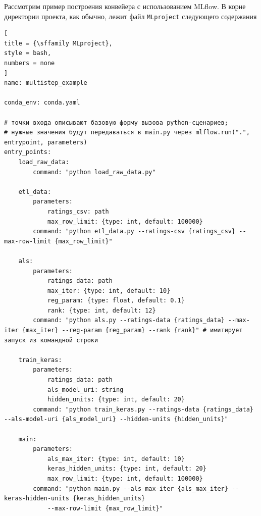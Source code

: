 \documentclass[%
	11pt,
	a4paper,
	utf8,
		]{article}
\begin{document}
Рассмотрим пример построения конвейера с использованием MLflow. В корне директории проекта, как обычно, лежит файл \texttt{MLproject} следующего содержания
\begin{lstlisting}[
title = {\sffamily MLproject},
style = bash,
numbers = none	
]
name: multistep_example

conda_env: conda.yaml

# точки входа описывают базовую форму вызова python-сценариев;
# нужные значения будут передаваться в main.py через mlflow.run(".", entrypoint, parameters)
entry_points:
	load_raw_data:
		command: "python load_raw_data.py"

	etl_data:
		parameters:
			ratings_csv: path
			max_row_limit: {type: int, default: 100000}
		command: "python etl_data.py --ratings-csv {ratings_csv} --max-row-limit {max_row_limit}"

	als:
		parameters:
			ratings_data: path
			max_iter: {type: int, default: 10}
			reg_param: {type: float, default: 0.1}
			rank: {type: int, default: 12}
		command: "python als.py --ratings-data {ratings_data} --max-iter {max_iter} --reg-param {reg_param} --rank {rank}" # имитирует запуск из командной строки

	train_keras:
		parameters:
			ratings_data: path
			als_model_uri: string
			hidden_units: {type: int, default: 20}
		command: "python train_keras.py --ratings-data {ratings_data} --als-model-uri {als_model_uri} --hidden-units {hidden_units}"

	main:
		parameters:
			als_max_iter: {type: int, default: 10}
			keras_hidden_units: {type: int, default: 20}
			max_row_limit: {type: int, default: 100000}
		command: "python main.py --als-max-iter {als_max_iter} --keras-hidden-units {keras_hidden_units}
			--max-row-limit {max_row_limit}"
\end{lstlisting}
\end{document}
